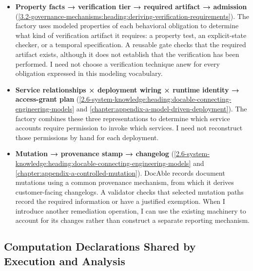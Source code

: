\begin{itemize}
\item \textbf{Property facts → verification tier → required artifact → admission} (\cref{3.2-governance-mechanisms:heading:deriving-verification-requirements}). The factory uses modeled properties of each behavioral obligation to determine what kind of verification artifact it requires: a property test, an explicit-state checker, or a temporal specification. A reusable gate checks that the required artifact exists, although it does not establish that the verification has been performed. I need not choose a verification technique anew for every obligation expressed in this modeling vocabulary.

\item \textbf{Service relationships × deployment wiring × runtime identity → access-grant plan} (\cref{2.6-system-knowledge:heading:docable-connecting-engineering-models} and \cref{chapter:appendix-a-model-driven-deployment}). The factory combines these three representations to determine which service accounts require permission to invoke which services. I need not reconstruct those permissions by hand for each deployment.

\item \textbf{Mutation → provenance stamp → changelog} (\cref{2.6-system-knowledge:heading:docable-connecting-engineering-models} and \cref{chapter:appendix-a-controlled-mutation}). DocAble records document mutations using a common provenance mechanism, from which it derives customer-facing changelogs. A validator checks that selected mutation paths record the required information or have a justified exemption. When I introduce another remediation operation, I can use the existing machinery to account for its changes rather than construct a separate reporting mechanism.
\end{itemize}

\subsection{Computation Declarations Shared by Execution and Analysis}\label{heading:the-computation-graph-a-representation-that-took-over-execution}

